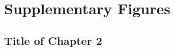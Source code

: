 \chapter{Supplementary Figures}
\chapfigures{}

\section*{Title of Chapter 2}
\setcounter{figure}{0}
\renewcommand\thefigure{S2.\arabic{figure}}

